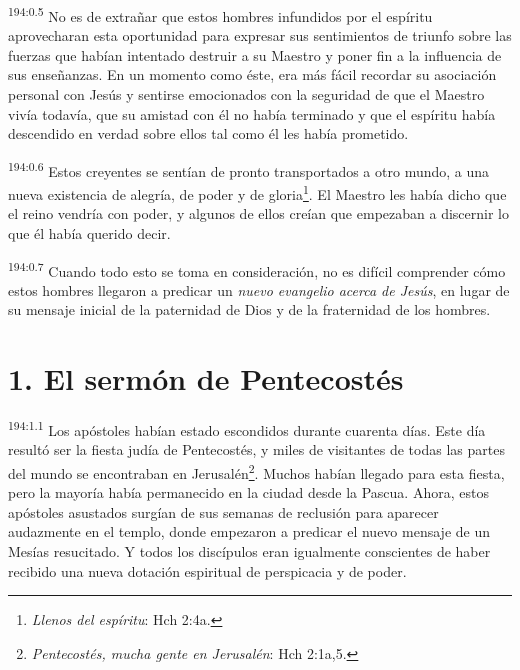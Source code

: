 \par
\textsuperscript{194:0.5} No es de extrañar que estos hombres infundidos por el espíritu aprovecharan esta oportunidad para expresar sus sentimientos de triunfo sobre las fuerzas que habían intentado destruir a su Maestro y poner fin a la influencia de sus enseñanzas. En un momento como éste, era más fácil recordar su asociación personal con Jesús y sentirse emocionados con la seguridad de que el Maestro vivía todavía, que su amistad con él no había terminado y que el espíritu había descendido en verdad sobre ellos tal como él les había prometido.

\par
\textsuperscript{194:0.6} Estos creyentes se sentían de pronto transportados a otro mundo, a una nueva existencia de alegría, de poder y de gloria\footnote{\textit{Llenos del espíritu}: Hch 2:4a.}. El Maestro les había dicho que el reino vendría con poder, y algunos de ellos creían que empezaban a discernir lo que él había querido decir.

\par
\textsuperscript{194:0.7} Cuando todo esto se toma en consideración, no es difícil comprender cómo estos hombres llegaron a predicar un \textit{nuevo evangelio acerca de Jesús}, en lugar de su mensaje inicial de la paternidad de Dios y de la fraternidad de los hombres.

\section*{1. El sermón de Pentecostés}
\par
\textsuperscript{194:1.1} Los apóstoles habían estado escondidos durante cuarenta días. Este día resultó ser la fiesta judía de Pentecostés, y miles de visitantes de todas las partes del mundo se encontraban en Jerusalén\footnote{\textit{Pentecostés, mucha gente en Jerusalén}: Hch 2:1a,5.}. Muchos habían llegado para esta fiesta, pero la mayoría había permanecido en la ciudad desde la Pascua. Ahora, estos apóstoles asustados surgían de sus semanas de reclusión para aparecer audazmente en el templo, donde empezaron a predicar el nuevo mensaje de un Mesías resucitado. Y todos los discípulos eran igualmente conscientes de haber recibido una nueva dotación espiritual de perspicacia y de poder.

